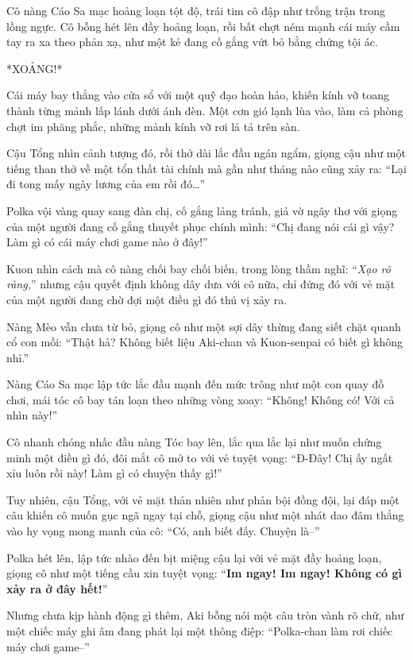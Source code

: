 \documentclass[../main.tex]{subfiles}
\begin{document}
Cô nàng Cáo Sa mạc hoảng loạn tột độ, trái tim cô đập như trống trận trong lồng ngực. Cô bỗng hét lên đầy hoảng loạn, rồi bất chợt ném mạnh cái máy cầm tay ra xa theo phản xạ, như một kẻ đang cố gắng vứt bỏ bằng chứng tội ác.

*XOẢNG!*

Cái máy bay thẳng vào cửa sổ với một quỹ đạo hoàn hảo, khiến kính vỡ toang thành từng mảnh lấp lánh dưới ánh đèn. Một cơn gió lạnh lùa vào, làm cả phòng chợt im phăng phắc, những mảnh kính vỡ rơi lả tả trên sàn.


Cậu Tổng nhìn cảnh tượng đó, rồi thở dài lắc đầu ngán ngẩm, giọng cậu như một tiếng than thở về một tổn thất tài chính mà gần như tháng nào cũng xảy ra: ``Lại đi tong mấy ngày lương của em rồi đó\dots''

Polka vội vàng quay sang đàn chị, cố gắng lảng tránh, giả vờ ngây thơ với giọng của một người đang cố gắng thuyết phục chính mình: ``Chị đang nói cái gì vậy? Làm gì có cái máy chơi game nào ở đây!''

Kuon nhìn cách mà cô nàng chối bay chối biến, trong lòng thầm nghĩ: ``\textit{Xạo rõ ràng,}'' nhưng cậu quyết định không dây dưa với cô nữa, chỉ đứng đó với vẻ mặt của một người đang chờ đợi một điều gì đó thú vị xảy ra.

Nàng Mèo vẫn chưa từ bỏ, giọng cô như một sợi dây thừng đang siết chặt quanh cổ con mồi: ``Thật hả? Không biết liệu Aki-chan và Kuon-senpai có biết gì không nhỉ.''

Nàng Cáo Sa mạc lập tức lắc đầu mạnh đến mức trông như một con quay đồ chơi, mái tóc cô bay tán loạn theo những vòng xoay: ``Không! Không có! Với cả nhìn này!''

Cô nhanh chóng nhấc đầu nàng Tóc bay lên, lắc qua lắc lại như muốn chứng minh một điều gì đó, đôi mắt cô mở to với vẻ tuyệt vọng: ``Đ-Đây! Chị ấy ngất xỉu luôn rồi này! Làm gì có chuyện thấy gì!''


Tuy nhiên, cậu Tổng, với vẻ mặt thản nhiên như phản bội đồng đội, lại đáp một câu khiến cô muốn gục ngã ngay tại chỗ, giọng cậu như một nhát dao đâm thẳng vào hy vọng mong manh của cô: ``Có, anh biết đấy. Chuyện là--''

Polka hét lên, lập tức nhào đến bịt miệng cậu lại với vẻ mặt đầy hoảng loạn, giọng cô như một tiếng cầu xin tuyệt vọng: ``\textbf{Im ngay! Im ngay! Không có gì xảy ra ở đây hết!}''

Nhưng chưa kịp hành động gì thêm, Aki bỗng nói một câu tròn vành rõ chữ, như một chiếc máy ghi âm đang phát lại một thông điệp: ``Polka-chan làm rơi chiếc máy chơi game--''
\end{document}
